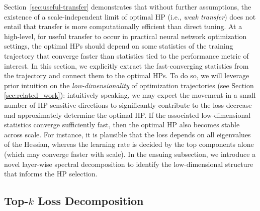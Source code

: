 \documentclass{article} %
\begin{document}
Section~\ref{sec:useful-transfer} demonstrates that without further assumptions, the existence of a scale-independent limit of optimal HP (i.e., \textit{weak transfer}) does not entail that transfer is more computationally efficient than direct tuning. At a high-level, for useful transfer to occur in practical neural network optimization settings, the optimal HPs should depend on some statistics of the training trajectory that converge faster than statistics tied to the performance metric of interest. 
In this section, we explicitly extract the fast-converging statistics from the trajectory and connect them to the optimal HPs. 
To do so, we will leverage prior intuition on the \textit{low-dimensionality} of optimization trajectories (see Section \ref{sec:related_work}): intuitively speaking, we may expect the movement in a small number of HP-sensitive directions to significantly contribute to the loss decrease and approximately determine the optimal HP. If the associated low-dimensional statistics converge sufficiently fast, then the optimal HP also becomes stable across scale. For instance, it is plausible that the loss depends on all eigenvalues of the Hessian, whereas the learning rate is decided by the top components alone (which may converge faster with scale). In the ensuing subsection, we introduce a novel layer-wise spectral decomposition to identify the low-dimensional structure that informs the HP selection.

\vspace{-1.5mm}
\subsection{\texorpdfstring{Top-$k$ Loss Decomposition}{Top-k Loss Decomposition}}\label{sec:topk_decomposition}
\vspace{-1.mm}
\end{document}
